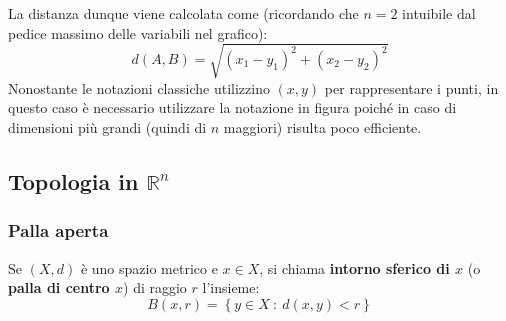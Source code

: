 \documentclass[a4paper]{article}
\begin{document}
	\noindent
	La distanza dunque viene calcolata come (ricordando che $n = 2$ intuibile dal pedice massimo delle variabili nel grafico):
	\begin{equation*}
		d\left(A, B\right) = \sqrt{\left(x_{1}-y_{1}\right)^{2} + \left(x_{2}-y_{2}\right)^{2}}
	\end{equation*}
	Nonostante le notazioni classiche utilizzino $\left(x,y\right)$ per rappresentare i punti, in questo caso è necessario utilizzare la notazione in figura poiché in caso di dimensioni più grandi (quindi di $n$ maggiori) risulta poco efficiente.

	\subsection{Topologia in $\mathbb{R}^{n}$}\label{subsection: topologia in R^n}

	\subsubsection{Palla aperta}\label{subsubsection: palla aperta}

	\begin{boxdef}
		Se $\left(X,d\right)$ è uno spazio metrico e $x \in X$, si chiama \textbf{intorno sferico di $x$} (o \textbf{palla di centro $x$}) di raggio $r$ l'insieme:
		\begin{equation}\label{eq: palla di centro x (formale)}
			B\left(x,r\right) = \left\{y \in X \: : \: d\left(x,y\right) < r\right\}
		\end{equation}
	\end{boxdef}
\end{document}
